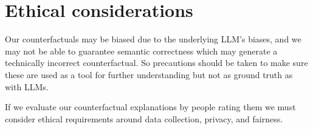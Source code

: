\chapter{Ethical considerations}
Our counterfactuals may be biased due to the underlying LLM's biases, and we may not be able to guarantee semantic correctness which may generate a technically incorrect counterfactual. So precautions should be taken to make sure these are used as a tool for further understanding but not as ground truth as with LLMs.

If we evaluate our counterfactual explanations by people rating them we must consider ethical requirements around data collection, privacy, and fairness.

